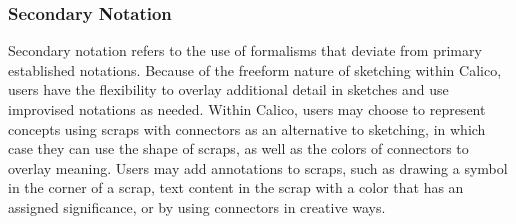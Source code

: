 

\subsubsection{Secondary Notation}

Secondary notation refers to the use of formalisms that deviate from primary established notations. Because of the freeform nature of sketching within Calico, users have the flexibility to overlay additional detail in sketches and use improvised notations as needed. Within Calico, users may choose to represent concepts using scraps with connectors as an alternative to sketching, in which case they can use the shape of scraps, as well as the colors of connectors to overlay meaning. Users may add annotations to scraps, such as drawing a symbol in the corner of a scrap, text content in the scrap with a color that has an assigned significance, or by using connectors in creative ways.

